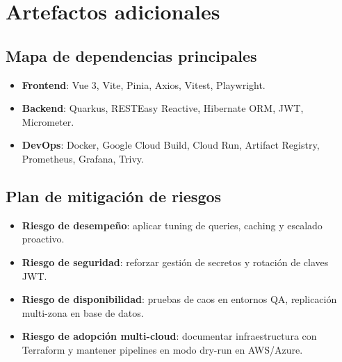 \documentclass[12pt,letterpaper]{article}
\begin{document}
\appendix

\section{Artefactos adicionales}
\subsection{Mapa de dependencias principales}
\begin{itemize}[leftmargin=1.2cm]
  \item \textbf{Frontend}: Vue 3, Vite, Pinia, Axios, Vitest, Playwright.
  \item \textbf{Backend}: Quarkus, RESTEasy Reactive, Hibernate ORM, JWT, Micrometer.
  \item \textbf{DevOps}: Docker, Google Cloud Build, Cloud Run, Artifact Registry, Prometheus, Grafana, Trivy.
\end{itemize}

\subsection{Plan de mitigación de riesgos}
\begin{itemize}[leftmargin=1.2cm]
  \item \textbf{Riesgo de desempeño}: aplicar tuning de queries, caching y escalado proactivo.
  \item \textbf{Riesgo de seguridad}: reforzar gestión de secretos y rotación de claves JWT.
  \item \textbf{Riesgo de disponibilidad}: pruebas de caos en entornos QA, replicación multi-zona en base de datos.
  \item \textbf{Riesgo de adopción multi-cloud}: documentar infraestructura con Terraform y mantener pipelines en modo dry-run en AWS/Azure.
\end{itemize}
\end{document}
